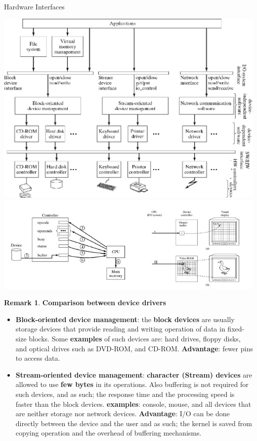 \documentclass[11pt,a4paper]{article}
\theoremstyle{definition}
\newtheorem*{remark}{Remark}
\newenvironment{myitemize}
{ \begin{itemize}
    \setlength{\itemsep}{5pt}
    \setlength{\parskip}{0pt}
    \setlength{\parsep}{0pt}     }
{ \end{itemize}                  }
\begin{document}
\begin{tcolorbox}
	\textsf{Hardware Interfaces}
	
	\includegraphics[scale=0.3]{m1/hardwareDevice}
	\centering
	\includegraphics[scale=0.4]{m1/hardwareController}
	\centering
\end{tcolorbox}

\begin{remark}{\textbf{Comparison between device drivers}}
	\begin{myitemize}
		\item \textbf{Block-oriented device management}: the \textbf{block devices} are usually storage devices that provide reading and writing operation of data in fixed-size blocks. Some \textbf{examples} of such devices are: hard drives, floppy disks, and optical drives such as DVD-ROM, and CD-ROM. \textbf{Advantage}: fewer pins to access data.
		\item \textbf{Stream-oriented device management}: \textbf{character (Stream) devices} are allowed to use \textbf{few bytes} in its operations. Also buffering is not required for such devices, and as such; the response time and the processing speed is faster than the block devices. \textbf{examples}: console, mouse, and all devices that are neither storage nor network devices. \textbf{Advantage}: I/O can be done directly between the device and the user and as such; the kernel is saved from copying operation and the overhead of buffering mechanisms.
	\end{myitemize}
\end{remark}
\end{document}
